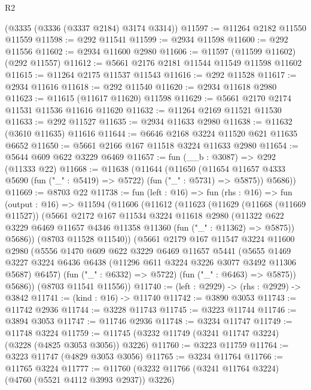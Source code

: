 \begin{lexlean}{R2}
\begin{coremodule}
    (@3335 (@3336 (@3337 @2184) @3174 @3314))
@11597 := @11264 @2182 @11550 @11559
@11598 := @292 @11541
@11599 := @2934 @11598
@11600 := @292 @11556
@11602 := @2934 @11600 @2980
@11606 := @11597 (@11599 @11602) (@292 @11557)
@11612 := @5661 @2176 @2181 @11544 @11549 @11598 @11602
@11615 := @11264 @2175 @11537 @11543
@11616 := @292 @11528
@11617 := @2934 @11616
@11618 := @292 @11540
@11620 := @2934 @11618 @2980
@11623 := @11615 (@11617 @11620) @11598
@11629 := @5661 @2170 @2174 @11531 @11536 @11616 @11620
@11632 := @11264 @2169 @11521 @11530
@11633 := @292 @11527
@11635 := @2934 @11633 @2980
@11638 := @11632 (@3610 @11635) @11616
@11644 := @6646 @2168 @3224 @11520 @621 @11635 @6652
@11650 := @5661 @2166 @167 @11518 @3224 @11633 @2980
@11654 := @5644 @609 @622 @3229 @6469
@11657 := fun (__b : @3087) => @292 (@11333 @22)
@11668 := @11638
    (@11644
      (@11650
        (@11654 @11657 @4333 @5690 (fun ("_" : @5419) => @5722) (fun ("_" : @5731) => @5875))
        @5686))
@11669 := @8703 @22
@11738 := fun (left : @16) =>
  fun (rhs : @16) =>
  fun (output : @16) =>
  @11594
    (@11606
      (@11612
        (@11623
          (@11629
            (@11668 (@11669 @11527))
            (@5661
              @2172
              @167
              @11534
              @3224
              @11618
              @2980
              (@11322 @622 @3229 @6469 @11657 @4346 @11358 @11360 (fun ("_" : @11362) => @5875))
              @5686))
          (@8703 @11528 @11540))
        (@5661
          @2179
          @167
          @11547
          @3224
          @11600
          @2980
          (@5556
            @1470
            @609
            @622
            @3229
            @6469
            @11657
            @5441
            (@5655
              @1469
              @3227
              @3224
              @6436
              @6438
              (@11296 @611 @3224 @3226 @3077 @3492 @11306 @5687)
              @6457)
            (fun ("_" : @6332) => @5722)
            (fun ("_" : @6463) => @5875))
          @5686))
      (@8703 @11541 @11556))
@11740 := (left : @2929) -> (rhs : @2929) -> @3842
@11741 := (kind : @16) -> @11740
@11742 := @3890 @3053
@11743 := @11742 @2936
@11744 := @3228 @11743
@11745 := @3223 @11744
@11746 := @3894 @3053
@11747 := @11746 @2936
@11748 := @3234 @11747
@11749 := @11748 @3224
@11759 := @11745 (@3232 @11749 (@3241 @11747 @3224) (@3228 (@4825 @3053 @3056)) @3226)
@11760 := @3223 @11759
@11764 := @3223 @11747 (@4829 @3053 @3056)
@11765 := @3234 @11764
@11766 := @11765 @3224
@11777 := @11760 (@3232 @11766 (@3241 @11764 @3224) (@4760 (@5521 @4112 @3993 @2937)) @3226)

\end{coremodule}
\end{lexlean}
